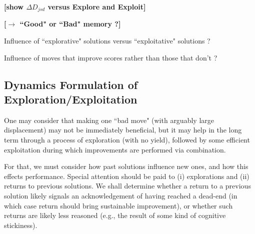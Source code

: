 {\bf [show $\Delta D_{jsd}$ versus Explore and Exploit]}

{\bf [$\rightarrow$  ``Good" or ``Bad" memory ?]}


Influence of ``explorative" solutions versus ``exploitative" solutions ?

Influence of moves that improve scores rather than those that don't ?



\subsection{Dynamics Formulation of Exploration/Exploitation}

One may consider that making one ``bad move" (with arguably large displacement) may not be immediately beneficial, but it may help in the long term through a process of exploration (with no yield), followed by some efficient exploitation during which improvements are performed via combination.

For that, we must consider how past solutions influence new ones, and how this effects performance. Special attention should be paid to (i) explorations and (ii) returns to previous solutions. We shall determine whether a return to a previous solution likely signals an acknowledgement of having reached a dead-end (in which case return should bring sustainable improvement), or whether such returns are likely less reasoned (e.g., the result of some kind of cognitive stickiness).




